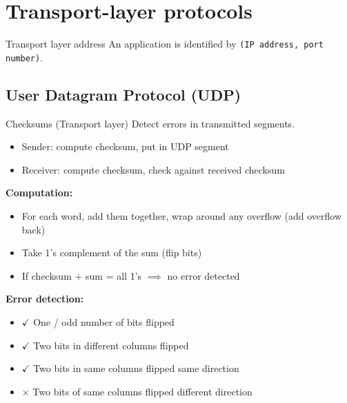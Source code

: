 \section{Transport-layer protocols}

\begin{knBox}
    {Transport layer address}
    An application is identified by \texttt{(IP address, port number)}.
\end{knBox}

\subsection{User Datagram Protocol (UDP)}


\begin{theorem}
    {Checksums (Transport layer)}
    Detect errors in transmitted segments.

    \begin{itemize}
        \item Sender: compute checksum, put in UDP segment
        \item Receiver: compute checksum, check against received checksum
    \end{itemize}

    \textbf{Computation:}

    \begin{itemize}
        \item For each word, add them together, wrap around any overflow (add overflow back)
        \item Take 1's complement of the sum (flip bits)
        \item If checksum + sum = all 1's $\implies$ no error detected
    \end{itemize}

    \textbf{Error detection:}
    \begin{itemize}
        \item $\checkmark$ One / odd number of bits flipped
        \item $\checkmark$ Two bits in different columns flipped
        \item $\checkmark$ Two bits in same columns flipped same direction
        \item $\times$ Two bits of same columns flipped different direction
    \end{itemize}
\end{theorem}

